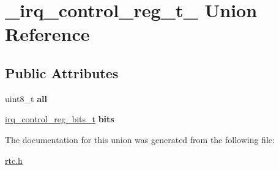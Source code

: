 \hypertarget{union__irq__control__reg__t__}{}\section{\+\_\+irq\+\_\+control\+\_\+reg\+\_\+t\+\_\+ Union Reference}
\label{union__irq__control__reg__t__}
\subsection*{Public Attributes}
\begin{DoxyCompactItemize}
\item 
\mbox{\label{union__irq__control__reg__t___ad59b9a77ff07ead673cfef83256d906b}} 
uint8\+\_\+t {\bfseries all}
\item 
\mbox{\label{union__irq__control__reg__t___a138e5d22e95a902c37fb2ec735d814f6}} 
\hyperlink{struct__irq__control__reg__bits__t__}{irq\+\_\+control\+\_\+reg\+\_\+bits\+\_\+t} {\bfseries bits}
\end{DoxyCompactItemize}


The documentation for this union was generated from the following file\+:\begin{DoxyCompactItemize}
\item 
\hyperlink{rtc_8h}{rtc.\+h}\end{DoxyCompactItemize}
